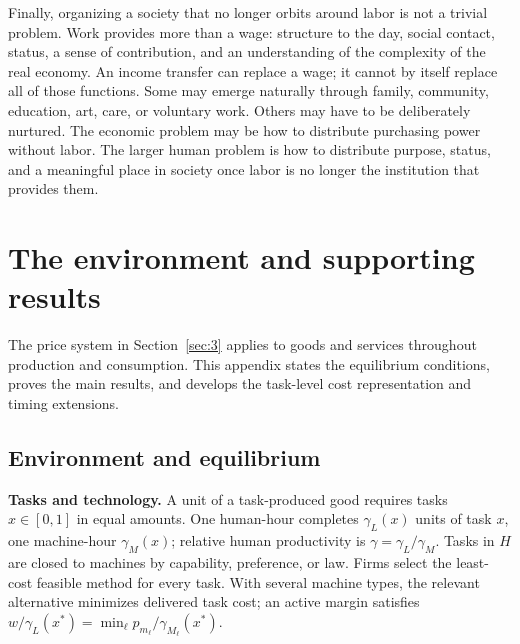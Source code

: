 \documentclass[12pt]{article}
\theoremstyle{plain}
\begin{document}
Finally, organizing a society that no longer orbits around labor is not a trivial problem. Work provides more than a wage: structure to the day, social contact, status, a sense of contribution, and an understanding of the complexity of the real economy. An income transfer can replace a wage; it cannot by itself replace all of those functions. Some may emerge naturally through family, community, education, art, care, or voluntary work. Others may have to be deliberately nurtured. The economic problem may be how to distribute purchasing power without labor. The larger human problem is how to distribute purpose, status, and a meaningful place in society once labor is no longer the institution that provides them.

\appendix
{}

\section{The environment and supporting results}\label{app:A}

The price system in Section~\ref{sec:3} applies to goods and services throughout production and consumption. This appendix states the equilibrium conditions, proves the main results, and develops the task-level cost representation and timing extensions.

\subsection{Environment and equilibrium}\label{app:A.1}

\textbf{Tasks and technology.} A unit of a task-produced good requires tasks $x\in[0,1]$ in equal amounts. One human-hour completes $\gamma_L(x)$ units of task $x$, one machine-hour $\gamma_M(x)$; relative human productivity is $\gamma=\gamma_L/\gamma_M$. Tasks in $H$ are closed to machines by capability, preference, or law. Firms select the least-cost feasible method for every task. With several machine types, the relevant alternative minimizes delivered task cost; an active margin satisfies $w/\gamma_L(x^*)=\min_\ell p_{m_\ell}/\gamma_{M_\ell}(x^*)$.
\end{document}
